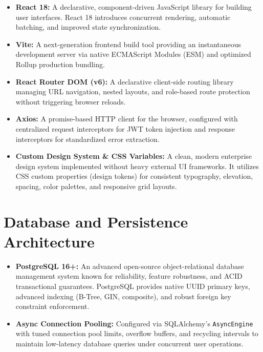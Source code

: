 \documentclass[11pt,a4paper,oneside]{report}
\begin{document}
\begin{itemize}
    \item \textbf{React 18:} A declarative, component-driven JavaScript library for building user interfaces. React 18 introduces concurrent rendering, automatic batching, and improved state synchronization.
    \item \textbf{Vite:} A next-generation frontend build tool providing an instantaneous development server via native ECMAScript Modules (ESM) and optimized Rollup production bundling.
    \item \textbf{React Router DOM (v6):} A declarative client-side routing library managing URL navigation, nested layouts, and role-based route protection without triggering browser reloads.
    \item \textbf{Axios:} A promise-based HTTP client for the browser, configured with centralized request interceptors for JWT token injection and response interceptors for standardized error extraction.
    \item \textbf{Custom Design System \& CSS Variables:} A clean, modern enterprise design system implemented without heavy external UI frameworks. It utilizes CSS custom properties (design tokens) for consistent typography, elevation, spacing, color palettes, and responsive grid layouts.
\end{itemize}

\section{Database and Persistence Architecture}
\label{sec:tech_persistence}
\begin{itemize}
    \item \textbf{PostgreSQL 16+:} An advanced open-source object-relational database management system known for reliability, feature robustness, and ACID transactional guarantees. PostgreSQL provides native UUID primary keys, advanced indexing (B-Tree, GIN, composite), and robust foreign key constraint enforcement.
    \item \textbf{Async Connection Pooling:} Configured via SQLAlchemy's \texttt{AsyncEngine} with tuned connection pool limits, overflow buffers, and recycling intervals to maintain low-latency database queries under concurrent user operations.
\end{itemize}
\end{document}
